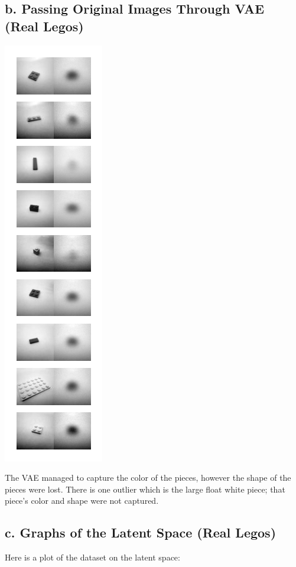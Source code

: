\documentclass{article}
\begin{document}
\subsection*{b. Passing Original Images Through VAE (Real Legos)}
\begin{center}
  \includegraphics[scale=1]{10_original-lego-dataset}
\end{center}

The VAE managed to capture the color of the pieces,
however the shape of the pieces were lost.
There is one outlier which is the large float white piece;
that piece's color and shape were not captured.

\subsection*{c. Graphs of the Latent Space (Real Legos)}

Here is a plot of the dataset on the latent space:
\end{document}
